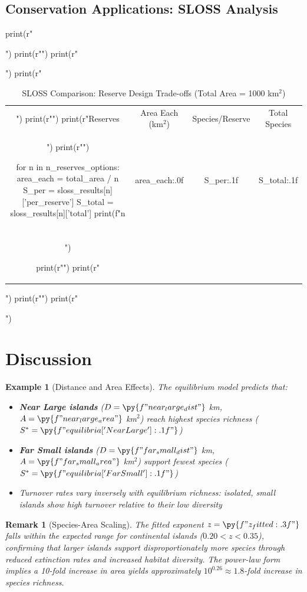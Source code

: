 \documentclass[a4paper, 11pt]{article}
\newtheorem{example}{Example}[section]
\newtheorem{remark}{Remark}[section]
\begin{document}
\subsection{Conservation Applications: SLOSS Analysis}

\begin{pycode}
print(r"\begin{table}[htbp]")
print(r"\centering")
print(r"\caption{SLOSS Comparison: Reserve Design Trade-offs (Total Area = 1000 km$^2$)}")
print(r"\begin{tabular}{cccc}")
print(r"\toprule")
print(r"Reserves & Area Each (km$^2$) & Species/Reserve & Total Species \\")
print(r"\midrule")

for n in n_reserves_options:
    area_each = total_area / n
    S_per = sloss_results[n]['per_reserve']
    S_total = sloss_results[n]['total']
    print(f"{n} & {area_each:.0f} & {S_per:.1f} & {S_total:.1f} \\\\")

print(r"\bottomrule")
print(r"\end{tabular}")
print(r"\label{tab:sloss}")
print(r"\end{table}")
\end{pycode}

\section{Discussion}

\begin{example}[Distance and Area Effects]
The equilibrium model predicts that:
\begin{itemize}
\item \textbf{Near Large islands} ($D = \py{f"{near_large_dist}"} $ km, $A = \py{f"{near_large_area}"}$ km$^2$) reach highest species richness ($S^* = \py{f"{equilibria['Near Large']:.1f}"}$)
\item \textbf{Far Small islands} ($D = \py{f"{far_small_dist}"}$ km, $A = \py{f"{far_small_area}"}$ km$^2$) support fewest species ($S^* = \py{f"{equilibria['Far Small']:.1f}"}$)
\item Turnover rates vary inversely with equilibrium richness: isolated, small islands show high turnover relative to their low diversity
\end{itemize}
\end{example}

\begin{remark}[Species-Area Scaling]
The fitted exponent $z = \py{f"{z_fitted:.3f}"}$ falls within the expected range for continental islands
($0.20 < z < 0.35$), confirming that larger islands support disproportionately more species through reduced
extinction rates and increased habitat diversity. The power-law form implies a 10-fold increase in area yields
approximately $10^{0.26} \approx 1.8$-fold increase in species richness.
\end{remark}
\end{document}
